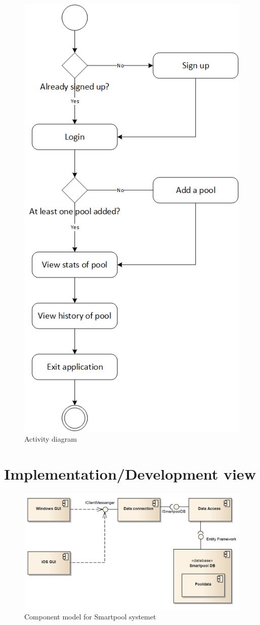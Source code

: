 \begin{figure}
\centering
\includegraphics[width=0.55\linewidth]{figs/arkitektur/ActivityDiagram.PNG}
\caption{Activity diagram}
\label{fig:ActivityDiagram}
\end{figure}


\section{Implementation/Development view}

\begin{figure}
\centering
\includegraphics[width=0.7\linewidth]{figs/arkitektur/componentModel}
\caption{Component model for Smartpool systemet}
\label{fig:componentModel}
\end{figure}

